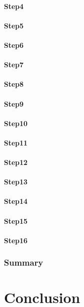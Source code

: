 \documentclass[a4paper, 11pt]{scrartcl}
\begin{document}
\paragraph{Step4}
\paragraph{Step5}
\paragraph{Step6}
\paragraph{Step7}
\paragraph{Step8}
\paragraph{Step9}
\paragraph{Step10}
\paragraph{Step11}
\paragraph{Step12}
\paragraph{Step13}
\paragraph{Step14}
\paragraph{Step15}
\paragraph{Step16}
\subsubsection{Summary}


\section{Conclusion}



\clearpage
\printbibliography[heading=bibintoc]
\end{document}
